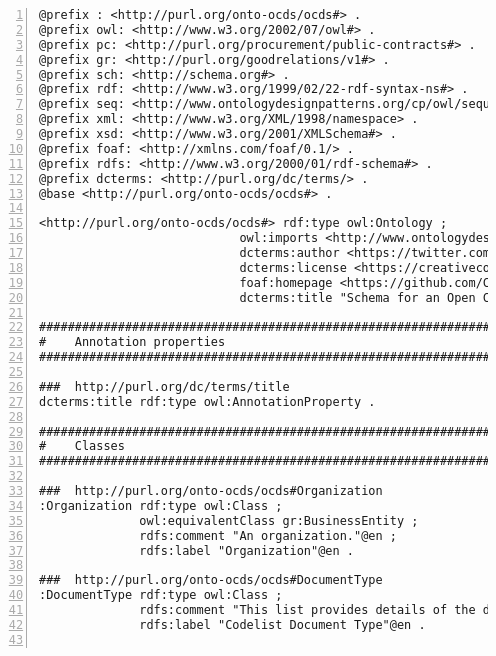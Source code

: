 \noindent\begin{minipage}{\textwidth}
 \begin{lstlisting}[captionpos=b, caption={Extracto de código de la ontología OCDSPY}, label={lst:ocdspyAnexo},  numbers=left,  numberstyle=\tiny\color{mygray},frame=single]
@prefix : <http://purl.org/onto-ocds/ocds#> .
@prefix owl: <http://www.w3.org/2002/07/owl#> .
@prefix pc: <http://purl.org/procurement/public-contracts#> .
@prefix gr: <http://purl.org/goodrelations/v1#> .
@prefix sch: <http://schema.org#> .
@prefix rdf: <http://www.w3.org/1999/02/22-rdf-syntax-ns#> .
@prefix seq: <http://www.ontologydesignpatterns.org/cp/owl/sequence.owl#> .
@prefix xml: <http://www.w3.org/XML/1998/namespace> .
@prefix xsd: <http://www.w3.org/2001/XMLSchema#> .
@prefix foaf: <http://xmlns.com/foaf/0.1/> .
@prefix rdfs: <http://www.w3.org/2000/01/rdf-schema#> .
@prefix dcterms: <http://purl.org/dc/terms/> .
@base <http://purl.org/onto-ocds/ocds#> .

<http://purl.org/onto-ocds/ocds#> rdf:type owl:Ontology ;
                            owl:imports <http://www.ontologydesignpatterns.org/cp/owl/sequence.owl> ;
                            dcterms:author <https://twitter.com/CMaudry> ;
                            dcterms:license <https://creativecommons.org/licenses/by/2.0/> ;
                            foaf:homepage <https://github.com/ColinMaudry/open-contracting-ld> ;
                            dcterms:title "Schema for an Open Contracting Release"@en .

#################################################################
#    Annotation properties
#################################################################

###  http://purl.org/dc/terms/title
dcterms:title rdf:type owl:AnnotationProperty .

#################################################################
#    Classes
#################################################################

###  http://purl.org/onto-ocds/ocds#Organization
:Organization rdf:type owl:Class ;
              owl:equivalentClass gr:BusinessEntity ;
              rdfs:comment "An organization."@en ;
              rdfs:label "Organization"@en .

###  http://purl.org/onto-ocds/ocds#DocumentType
:DocumentType rdf:type owl:Class ;
              rdfs:comment "This list provides details of the documents that publishers may wish to provide at various points their contracting process."@en ;
              rdfs:label "Codelist Document Type"@en .


\end{lstlisting}
\end{minipage}
